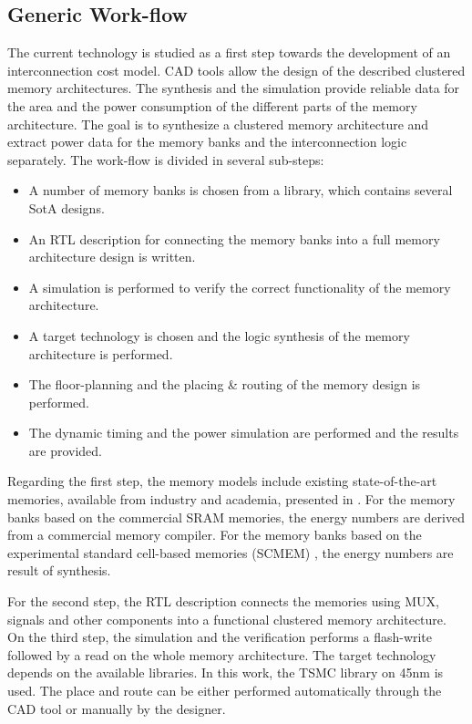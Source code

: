 \subsection{Generic Work-flow}

The current technology is studied as a first step towards the development of an interconnection cost model. 
CAD tools allow the design of the described clustered memory architectures.
The synthesis and the simulation provide reliable data for the area and the power consumption of the different parts of the memory architecture.
The goal is to synthesize a clustered memory architecture and extract power data for the memory banks and the interconnection logic separately.
The work-flow is divided in several sub-steps:

\begin{itemize}
	\item A number of memory banks is chosen from a library, which contains several SotA designs.
	\item An RTL description for connecting the memory banks into a full memory architecture design is written.
	\item A simulation is performed to verify the correct functionality of the memory architecture.
	\item A target technology is chosen and the logic synthesis of the memory architecture is performed.
	\item The floor-planning and the placing \& routing of the memory design is performed.
	\item The dynamic timing and the power simulation are performed and the results are provided.
\end{itemize}

Regarding the first step, the memory models include existing state-of-the-art memories, available from industry and academia, presented in \cite{filippopoulos2013exploration}.
For the memory banks based on the commercial SRAM memories, the energy numbers are derived from a commercial memory compiler.
For the memory banks based on the experimental standard cell-based memories (SCMEM) \cite{Mei11},  the energy numbers are result of synthesis.

For the second step, the RTL description connects the memories using MUX, signals and other components into a functional clustered memory architecture. 
On the third step, the simulation and the verification performs a flash-write followed by a read on the whole memory architecture. 
The target technology depends on the available libraries.
In this work, the TSMC library on 45nm is used.
The place and route can be either performed automatically through the CAD tool or manually by the designer.

